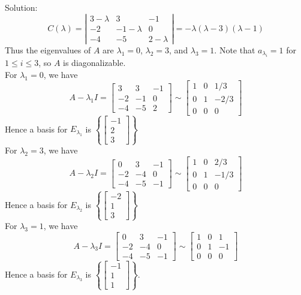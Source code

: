\documentclass[10pt,letter]{article}
\begin{document}
Solution: $$C(\lambda)=\left|\begin{matrix}3-\lambda&3&-1\\-2&-1-\lambda&0\\-4&-5&2-\lambda\end{matrix}\right|=-\lambda(\lambda-3)(\lambda-1)$$ Thus the eigenvalues of $A$ are $\lambda_1=0$, $\lambda_2=3$, and $\lambda_3=1$. Note that $a_{\lambda_i}=1$ for $1\leq i\leq 3$, so $A$ is diagonalizable. \\ 
For $\lambda_1=0$, we have $$A-\lambda_1I=\begin{bmatrix}3&3&-1\\-2&-1&0\\-4&-5&2\end{bmatrix}\sim\begin{bmatrix}1&0&1/3\\0&1&-2/3\\0&0&0\end{bmatrix}$$ Hence a basis for $E_{\lambda_1}$ is $\left\{\begin{bmatrix}-1\\2\\3\end{bmatrix}\right\}$ \\ 
For $\lambda_2=3$, we have $$A-\lambda_2I=\begin{bmatrix}0&3&-1\\-2&-4&0\\-4&-5&-1\end{bmatrix}\sim\begin{bmatrix}1&0&2/3\\0&1&-1/3\\0&0&0\end{bmatrix}$$ Hence a basis for $E_{\lambda_2}$ is $\left\{\begin{bmatrix}-2\\1\\3\end{bmatrix}\right\}$ \\ 
For $\lambda_3=1$, we have $$A-\lambda_3I=\begin{bmatrix}0&3&-1\\-2&-4&0\\-4&-5&-1\end{bmatrix}\sim\begin{bmatrix}1&0&1\\0&1&-1\\0&0&0\end{bmatrix}$$ Hence a basis for $E_{\lambda_3}$ is $\left\{\begin{bmatrix}-1\\1\\1\end{bmatrix}\right\}$. \\ 
\end{document}
